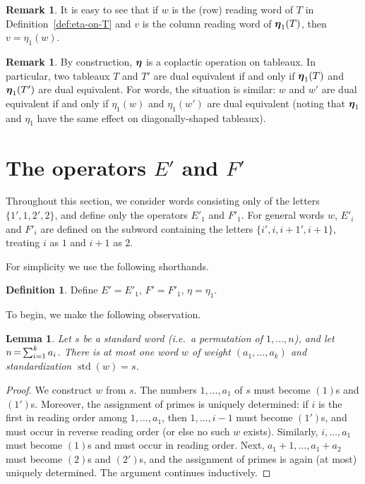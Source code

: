 \documentclass[10pt]{amsart}
\newtheorem{lemma}[theorem]{Lemma}
\theoremstyle{definition}
\newtheorem{defi}[theorem]{Definition}
\newtheorem{rema}[theorem]{Remark}
\providecommand{\ie}{i.e.\ }
\DeclareMathOperator{\std}{std}
\newcommand*{\Mk}{\mkern -2mu}
\begin{document}
\begin{rema} \label{rmk:row-col-eta}
It is easy to see that if $w$ is the (row) reading word of $T$ in Definition~\ref{def:eta-on-T} and $v$ is the column reading word of $\boldsymbol{\eta}_1(T)$, then $v=\eta_1(w)$.
\end{rema}

\begin{rema} \label{rmk:eta-words-dual}
By construction, $\boldsymbol{\eta}$ is a coplactic operation on tableaux. In particular, two tableaux $T$ and $T'$ are dual equivalent if and only if $\boldsymbol{\eta}_1(T)$ and $\boldsymbol{\eta}_1(T')$ are dual equivalent. For words, the situation is similar: $w$ and $w'$ are dual equivalent if and only if $\eta_1(w)$ and $\eta_1(w')$ are dual equivalent (noting that $\boldsymbol{\eta}_1$ and $\eta_1$ have the same effect on diagonally-shaped tableaux).
\end{rema}



\section{The operators \texorpdfstring{$E'$}{E'} and \texorpdfstring{$F'$}{F'}}\label{sec:primed-ops}

Throughout this section, we consider words consisting only of the letters $\{1',1,2',2\}$, and define only the operators $E'_1$ and $F'_1$. For general words $w$, $E'_i$ and $F'_i$ are defined on the subword containing the letters $\{i',i,i{+}1',i{+}1\}$, treating $i$ as $1$ and $i{+}1$ as $2$.

For simplicity we use the following shorthands.

\begin{defi}
Define $E' = E'_1$, $F' = F'_1$, $\eta= \eta_1.$
\end{defi}

To begin, we make the following observation.

\begin{lemma} \label{lem:unstandardize}
Let $s$ be a standard word \textup{(}\ie a permutation of $1, \ldots, n$\textup{)}, and let $n \Mk =\Mk  \sum_{i=1}^k a_i$. There is at most one word $w$ of weight $(a_1,\ldots,a_k)$ and standardization $\std (w) = s$.
\end{lemma}

\begin{proof}
We construct $w$ from $s$. The numbers $1, \ldots, a_1$ of $s$ must become $(1)$s and $(1')$s. Moreover, the assignment of primes is uniquely determined: if $i$ is the first in reading order among $1, \ldots, a_1$, then $1, \ldots, i-1$ must become $(1')$s, and must occur in reverse reading order (or else no such $w$ exists). Similarly, $i, \ldots, a_1$ must become $(1)$s and must occur in reading order. Next, $a_1+1, \ldots, a_1+a_2$ must become $(2)$s and $(2')$s, and the assignment of primes is again (at most) uniquely determined. The argument continues inductively.
\end{proof}
\end{document}
